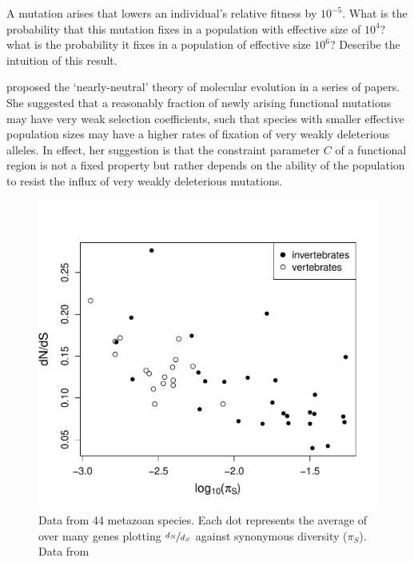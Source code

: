 \begin{question}
A mutation arises that lowers an individual’s relative fitness by
$10^{−5}$. What is the probability that this mutation fixes in a
population with effective size of $10^4$? what is the probability it
fixes in a population of effective size  $10^6$? Describe the
intuition of this result.
\end{question}

\citeauthor{ohta1973slightly}
proposed the `nearly-neutral' theory of
molecular evolution in a series of papers\cite{ohta1972population,ohta1973slightly,ohta1987very}. She suggested that a reasonably fraction of newly
arising functional mutations may have very weak selection
coefficients, such that species with smaller effective population sizes may
have a higher rates of fixation of very weakly deleterious
alleles. In effect, her suggestion is that the constraint parameter
$C$ of a functional region is not a fixed property but rather depends
on the ability of the population to resist the influx of very weakly
deleterious mutations. 



\begin{figure}
\begin{center}
\includegraphics[width=\textwidth]{Journal_figs/drift_selection/Galtier_dNdS/Galtier_dNdS.pdf}
\end{center}
\caption{Data from 44 metazoan species. Each dot represents the
  average of over many genes plotting $\nicefrac{d_N}{d_S}$ against synonymous
  diversity ($\pi_S$). Data from \citet{galtier2016adaptive} } \label{Galtier_dNdS}
\end{figure}

